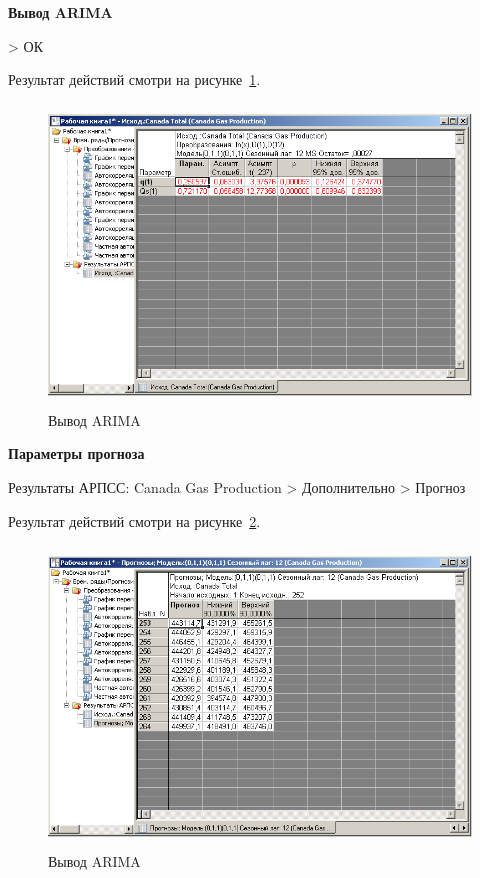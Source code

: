 \begin{center}
  \textbf{Вывод ARIMA}
\end{center}

> ОК

Результат действий смотри на рисунке~\ref{fig:2_13}.

\begin{figure}[!h]
  \centering

  \includegraphics[height=8cm]
  {inc/Canada_Gas_Production/13.PNG}

  \caption{Вывод ARIMA}

  \label{fig:2_13}
\end{figure}


\newpage

\begin{center}
  \textbf{Параметры прогноза}
\end{center}

Результаты АРПСС: Canada Gas Production
> Дополнительно > Прогноз

Результат действий смотри на рисунке~\ref{fig:2_14}.

\begin{figure}[!h]
  \centering

  \includegraphics[height=8cm]
  {inc/Canada_Gas_Production/14.PNG}

  \caption{Вывод ARIMA}

  \label{fig:2_14}
\end{figure}


